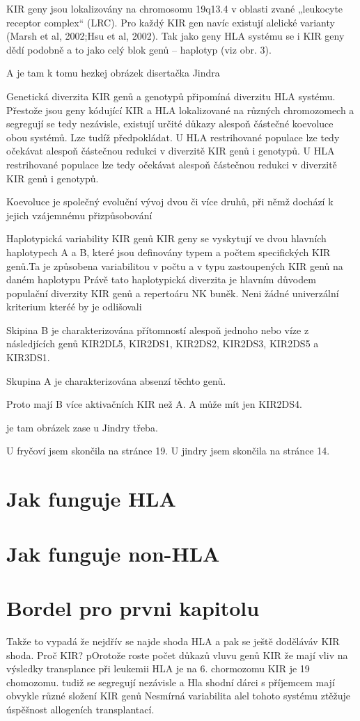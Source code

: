 \documentclass[czech,DP]{thesiskiv}
\begin{document}
KIR geny jsou lokalizovány na chromosomu 19q13.4 v oblasti zvané „leukocyte receptor
complex“ (LRC). Pro každý KIR gen navíc existují alelické varianty (Marsh et al, 2002;Hsu
et al, 2002). Tak jako geny HLA systému se i KIR geny dědí podobně a to jako celý blok
genů – haplotyp (viz obr. 3).

A je tam k tomu hezkej obrázek disertačka Jindra

Genetická diverzita KIR genů a genotypů připomíná diverzitu HLA
systému. Přestože jsou geny kódující KIR a HLA lokalizované na
různých chromozomech a segregují se tedy nezávisle, existují určité
důkazy alespoň částečné koevoluce obou systémů. Lze tudíž
předpokládat. U HLA restrihované populace lze tedy očekávat
alespoň částečnou redukci v diverzitě KIR genů i genotypů.
U HLA restrihované populace lze tedy očekávat
alespoň částečnou redukci v diverzitě KIR genů i genotypů.

Koevoluce je společný evoluční vývoj dvou či více druhů, při němž dochází k jejich vzájemnému přizpůsobování

Haplotypická variability KIR genů
KIR geny se vyskytují ve dvou hlavních haplotypech A a B, které jsou definovány typem a počtem specifických KIR genů.Ta je způsobena variabilitou v počtu a v typu
zastoupených KIR genů na daném haplotypu
Právě tato
haplotypická diverzita je hlavním důvodem populační diverzity KIR
genů a repertoáru NK buněk.
Neni žádné univerzální kriterium kteréé by je odlišovali

Skipina B je charakterizována přítomností alespoň jednoho nebo víze z následjících genů KIR2DL5, KIR2DS1, KIR2DS2, KIR2DS3, KIR2DS5 a KIR3DS1.

Skupina A je charakterizována absenzí těchto genů. 

Proto mají B více aktivačních KIR než A. A může mít jen KIR2DS4.

je tam obrázek zase u Jindry třeba.

U fryčoví jsem skončila na stránce 19. 
U jindry jsem skončila na stránce 14.



\section{Jak funguje HLA}
\section{Jak funguje non-HLA}

\section{Bordel pro prvni kapitolu}
Takže to vypadá že nejdřív se najde shoda HLA a pak se ještě doděláváv KIR shoda.
Proč KIR? pOrotože roste počet důkazů vluvu genů KIR že mají vliv na výsledky transplance  při leukemii
HLA je na 6. chormozomu KIR je 19 chomozomu. tudiž se segregují nezávisle a Hla shodní dárci s příjemcem mají obvykle různé složení KIR genů
Nesmírná variabilita alel tohoto systému ztěžuje úspěšnost allogeních transplantací. 
\end{document}
